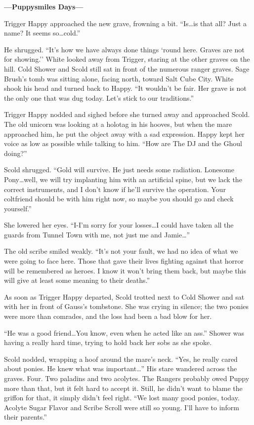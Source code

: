 \begin{center}
	\textbf{---Puppysmiles Days---}
\end{center}

Trigger Happy approached the new grave, frowning a bit. ``Is\dots is that all? Just a name? It seems so\dots cold.''

He shrugged. ``It's how we have always done things `round here. Graves are not for showing.'' White looked away from Trigger, staring at the other graves on the hill. Cold Shower and Scold still sat in front of the numerous ranger graves. Sage Brush's tomb was sitting alone, facing north, toward Salt Cube City. White shook his head and turned back to Happy. ``It wouldn't be fair. Her grave is not the only one that was dug today. Let's stick to our traditions.''

Trigger Happy nodded and sighed before she turned away and approached Scold. The old unicorn was looking at a holotag in his hooves, but when the mare approached him, he put the object away with a sad expression. Happy kept her voice as low as possible while talking to him. ``How are The DJ and the Ghoul doing?''

Scold shrugged. ``Gold will survive. He just needs some radiation. Lonesome Pony\dots well, we will try implanting him with an artificial spine, but we lack the correct instruments, and I don't know if he'll survive the operation. Your coltfriend should be with him right now, so maybe you should go and check yourself.''

She lowered her eyes. ``I-I'm sorry for your losses\dots I could have taken all the guards from Tunnel Town with me, not just me and Jamie\dots''

The old scribe smiled weakly. ``It's not your fault, we had no idea of what we were going to face here. Those that gave their lives fighting against that horror will be remembered as heroes. I know it won't bring them back, but maybe this will give at least some meaning to their deaths.''

As soon as Trigger Happy departed, Scold trotted next to Cold Shower and sat with her in front of Gauss's tombstone. She was crying in silence; the two ponies were more than comrades, and the loss had been a bad blow for her.

``He was a good friend\dots You know, even when he acted like an ass.'' Shower was having a really hard time, trying to hold back her sobs as she spoke.

Scold nodded, wrapping a hoof around the mare's neck. ``Yes, he really cared about ponies. He knew what was important\dots'' His stare wandered across the graves. Four. Two paladins and two acolytes. The Rangers probably owed Puppy more than that, but it felt hard to accept it. Still, he didn't want to blame the griffon for that, it simply didn't feel right. ``We lost many good ponies, today. Acolyte Sugar Flavor and Scribe Scroll were still so young. I'll have to inform their parents.''

